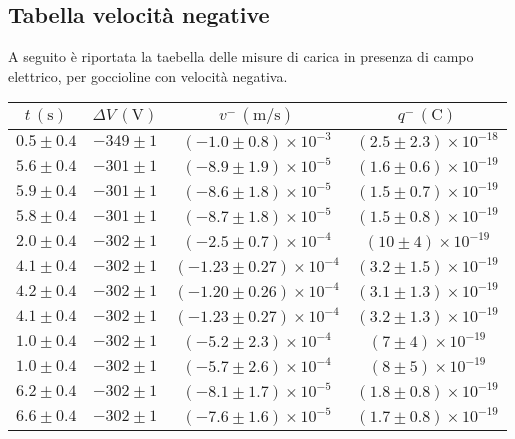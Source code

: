 \subsection{Tabella velocità negative}
A seguito è riportata la taebella delle misure di carica in presenza di campo elettrico, per goccioline con velocità negativa.        \renewcommand{\arraystretch}{1.3} %
        \begin{longtable}[C]{|c|c|c|c|}
            \hline
            $t \, (\mathrm{s})$ & $\Delta V \, (\mathrm{V})$ & $v^- \, (\mathrm{m/s})$ & $q^- \, (\mathrm{C})$ \\
            \hline
            $0.5 \pm 0.4$ & $-349 \pm 1$ & $(-1.0 \pm 0.8) \times 10^{-3}$ & $(2.5 \pm 2.3) \times 10^{-18}$ \\
            \hline
            $5.6 \pm 0.4$ & $-301 \pm 1$ & $(-8.9 \pm 1.9) \times 10^{-5}$ & $(1.6 \pm 0.6) \times 10^{-19}$ \\
            \hline
            $5.9 \pm 0.4$ & $-301 \pm 1$ & $(-8.6 \pm 1.8) \times 10^{-5}$ & $(1.5 \pm 0.7) \times 10^{-19}$ \\
            \hline
            $5.8 \pm 0.4$ & $-301 \pm 1$ & $(-8.7 \pm 1.8) \times 10^{-5}$ & $(1.5 \pm 0.8) \times 10^{-19}$ \\
            \hline
            $2.0 \pm 0.4$ & $-302 \pm 1$ & $(-2.5 \pm 0.7) \times 10^{-4}$ & $(10 \pm 4) \times 10^{-19}$ \\
            \hline
            $4.1 \pm 0.4$ & $-302 \pm 1$ & $(-1.23 \pm 0.27) \times 10^{-4}$ & $(3.2 \pm 1.5) \times 10^{-19}$ \\
            \hline
            $4.2 \pm 0.4$ & $-302 \pm 1$ & $(-1.20 \pm 0.26) \times 10^{-4}$ & $(3.1 \pm 1.3) \times 10^{-19}$ \\
            \hline
            $4.1 \pm 0.4$ & $-302 \pm 1$ & $(-1.23 \pm 0.27) \times 10^{-4}$ & $(3.2 \pm 1.3) \times 10^{-19}$ \\
            \hline
            $1.0 \pm 0.4$ & $-302 \pm 1$ & $(-5.2 \pm 2.3) \times 10^{-4}$ & $(7 \pm 4) \times 10^{-19}$ \\
            \hline
            $1.0 \pm 0.4$ & $-302 \pm 1$ & $(-5.7 \pm 2.6) \times 10^{-4}$ & $(8 \pm 5) \times 10^{-19}$ \\
            \hline
            $6.2 \pm 0.4$ & $-302 \pm 1$ & $(-8.1 \pm 1.7) \times 10^{-5}$ & $(1.8 \pm 0.8) \times 10^{-19}$ \\
            \hline
            $6.6 \pm 0.4$ & $-302 \pm 1$ & $(-7.6 \pm 1.6) \times 10^{-5}$ & $(1.7 \pm 0.8) \times 10^{-19}$ \\

\end{longtable}
